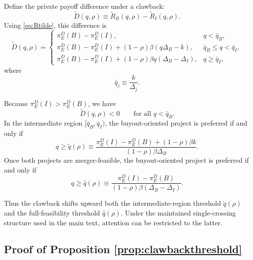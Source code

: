 Define the private payoff difference under a clawback:
\begin{equation}
    \widetilde D(q,\rho)\equiv \widetilde R_B(q,\rho)-\widetilde R_I(q,\rho).
\end{equation}
Using \eqref{eq:Rtilde}, this difference is
\begin{equation}\label{eq:Dqpiececlaw}
    \widetilde D(q,\rho)
    =
    \begin{cases}
        \pi_E^D(B)-\pi_E^D(I), &
        q < \bar q_B, \\
        \pi_E^D(B)-\pi_E^D(I)+(1-\rho)\beta(q\Delta_B-k), &
        \bar q_B \le q < \bar q_I, \\
        \pi_E^D(B)-\pi_E^D(I)+(1-\rho)\beta q(\Delta_B-\Delta_I), &
        q \ge \bar q_I,
    \end{cases}
\end{equation}
where
\begin{equation}
    \bar q_j\equiv \frac{k}{\Delta_j}.
\end{equation}

Because \(\pi_E^D(I)>\pi_E^D(B)\), we have
\begin{equation}
    \widetilde D(q,\rho)<0
    \qquad
    \text{for all } q<\bar q_B.
\end{equation}
In the intermediate region \([\bar q_B,\bar q_I)\), the buyout-oriented project is preferred if and only if
\begin{equation}\label{eq:qtilderho}
    q \ge \widetilde q(\rho)
    \equiv
    \frac{
        \pi_E^D(I)-\pi_E^D(B)+(1-\rho)\beta k
    }{
        (1-\rho)\beta\Delta_B
    }.
\end{equation}
Once both projects are merger-feasible, the buyout-oriented project is preferred if and only if
\begin{equation}\label{eq:qhatappendixrho}
    q \ge \hat q(\rho)
    \equiv
    \frac{
        \pi_E^D(I)-\pi_E^D(B)
    }{
        (1-\rho)\beta(\Delta_B-\Delta_I)
    }.
\end{equation}

Thus the clawback shifts upward both the intermediate-region threshold \(\widetilde q(\rho)\) and the full-feasibility threshold \(\hat q(\rho)\).
Under the maintained single-crossing structure used in the main text, attention can be restricted to the latter.

\subsection{Proof of Proposition \ref{prop:clawbackthreshold}}

